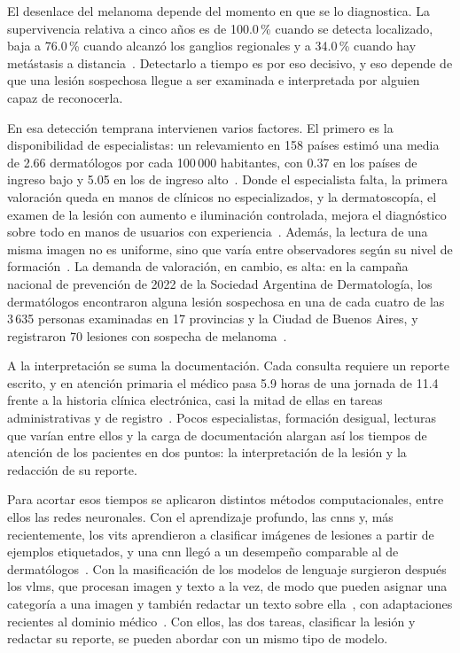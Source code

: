 El desenlace del melanoma depende del momento en que se lo diagnostica. La supervivencia relativa a cinco años
es de 100.0\,\% cuando se detecta localizado, baja a 76.0\,\% cuando alcanzó los ganglios regionales y a
34.0\,\% cuando hay metástasis a distancia~\cite{nci2026melanoma}. Detectarlo a tiempo es por eso decisivo, y
eso depende de que una lesión sospechosa llegue a ser examinada e interpretada por alguien capaz de reconocerla.

En esa detección temprana intervienen varios factores. El primero es la disponibilidad de especialistas: un
relevamiento en 158 países estimó una media de 2.66 dermatólogos por cada 100\,000 habitantes, con 0.37 en los
países de ingreso bajo y 5.05 en los de ingreso alto~\cite{freeman2026global}. Donde el especialista falta, la
primera valoración queda en manos de clínicos no especializados, y la dermatoscopía, el examen de la lesión con
aumento e iluminación controlada, mejora el diagnóstico sobre todo en manos de usuarios con
experiencia~\cite{dinnes2018dermoscopy}. Además, la lectura de una misma imagen no es uniforme, sino que varía entre
observadores según su nivel de formación~\cite{tschandl2019comparison}. La demanda de valoración, en cambio, es
alta: en la campaña nacional de prevención de 2022 de la Sociedad Argentina de Dermatología, los dermatólogos
encontraron alguna lesión sospechosa en una de cada cuatro de las 3\,635 personas examinadas en 17 provincias y
la Ciudad de Buenos Aires, y registraron 70 lesiones con sospecha de melanoma~\cite{sad2023campana}.

A la interpretación se suma la documentación. Cada consulta requiere un reporte escrito, y en atención primaria
el médico pasa 5.9 horas de una jornada de 11.4 frente a la historia clínica electrónica, casi la mitad de ellas
en tareas administrativas y de registro~\cite{arndt2017tethered}. Pocos especialistas, formación desigual,
lecturas que varían entre ellos y la carga de documentación alargan así los tiempos de atención de los pacientes
en dos puntos: la interpretación de la lesión y la redacción de su reporte.

Para acortar esos tiempos se aplicaron distintos métodos computacionales, entre ellos las redes neuronales. Con
el aprendizaje profundo, las \glspl{cnn} y, más recientemente, los \glspl{vit} aprendieron a clasificar
imágenes de lesiones a partir de ejemplos etiquetados, y una \gls{cnn} llegó a un desempeño comparable al de
dermatólogos~\cite{esteva2017dermatologistlevel}. Con la masificación de los modelos de lenguaje surgieron
después los \glspl{vlm}, que procesan imagen y texto a la vez, de modo que pueden asignar una categoría a una
imagen y también redactar un texto sobre ella~\cite{radford2021learning,liu2023visual}, con adaptaciones
recientes al dominio médico~\cite{li2023llavamed}. Con ellos, las dos tareas, clasificar la lesión y redactar su reporte, se pueden
abordar con un mismo tipo de modelo.

